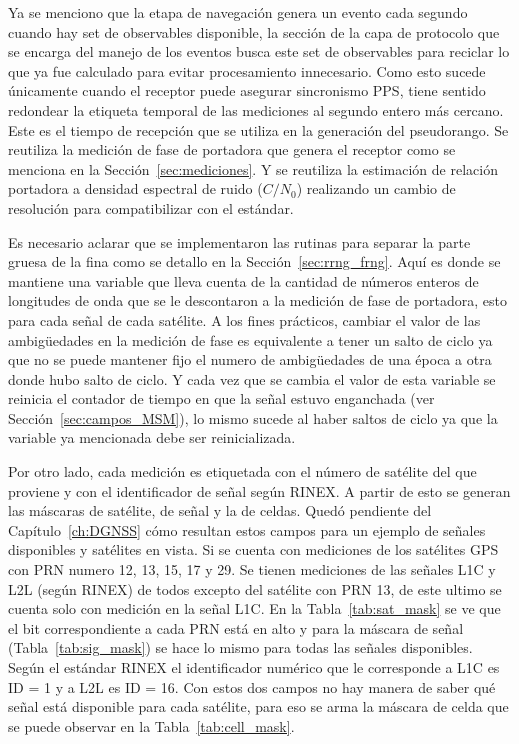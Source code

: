 \documentclass[a4paper,12pt,oneside,onecolumn,final,openright]{book}%
\begin{document}
	Ya se menciono que la etapa de navegación genera un evento cada segundo cuando hay set de observables disponible, la sección de la capa de protocolo que se encarga del manejo de los eventos busca este set de observables para reciclar lo que ya fue calculado para evitar procesamiento innecesario. Como esto sucede únicamente cuando el receptor puede asegurar sincronismo PPS, tiene sentido redondear la etiqueta temporal de las mediciones al segundo entero más cercano. Este es el tiempo de recepción que se utiliza en la generación del pseudorango. Se reutiliza la medición de fase de portadora que genera el receptor como se menciona en la Sección~\ref{sec:mediciones}. Y se reutiliza la estimación de relación portadora a densidad espectral de ruido ($C/N_0$) realizando un cambio de resolución para compatibilizar con el estándar.
	
	 Es necesario aclarar que se implementaron las rutinas para separar la parte gruesa de la fina como se detallo en la Sección~\ref{sec:rrng_frng}. Aquí es donde se mantiene una variable que lleva cuenta de la cantidad de números enteros de longitudes de onda que se le descontaron a la medición de fase de portadora, esto para cada señal de cada satélite. A los fines prácticos, cambiar el valor de las ambigüedades en la medición de fase es equivalente a tener un salto de ciclo ya que no se puede mantener fijo el numero de ambigüedades de una época a otra donde hubo salto de ciclo. Y cada vez que se cambia el valor de esta variable se reinicia el contador de tiempo en que la señal estuvo enganchada (ver Sección~\ref{sec:campos_MSM}), lo mismo sucede al haber saltos de ciclo ya que la variable ya mencionada debe ser reinicializada.
	
	Por otro lado, cada medición es etiquetada con el número de satélite del que proviene y con el identificador de señal según RINEX. A partir de esto se generan las máscaras de satélite, de señal y la de celdas. Quedó pendiente del Capítulo~\ref{ch:DGNSS} cómo resultan estos campos para un ejemplo de señales disponibles y satélites en vista. Si se cuenta con mediciones de los satélites GPS con PRN numero 12, 13, 15, 17 y 29. Se tienen mediciones de las señales L1C y L2L (según RINEX) de todos excepto del satélite con PRN 13, de este ultimo se cuenta solo con medición en la señal L1C. En la Tabla~\ref{tab:sat_mask} se ve que el bit correspondiente a cada PRN está en alto y para la máscara de señal (Tabla~\ref{tab:sig_mask}) se hace lo mismo para todas las señales disponibles. Según el estándar RINEX el identificador numérico que le corresponde a L1C es ID = 1 y a L2L es ID = 16. Con estos dos campos no hay manera de saber qué señal está disponible para cada satélite, para eso se arma la máscara de celda que se puede observar en la Tabla~\ref{tab:cell_mask}.
	
\end{document}

